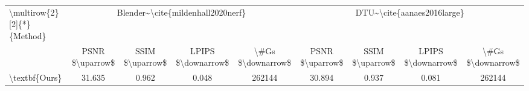 \begin{tabular}{lcccccccc}
\toprule
\textbackslash multirow\{2\}[2]\{*\}\{Method\} & \multicolumn{4}{c}{Blender\textasciitilde \textbackslash cite\{mildenhall2020nerf\}} & \multicolumn{4}{c}{DTU\textasciitilde \textbackslash cite\{aanaes2016large\}} \\
\cmidrule(lr){2-5}\cmidrule(lr){6-9}
                           &                   PSNR \$\textbackslash uparrow\$ & SSIM \$\textbackslash uparrow\$ & LPIPS \$\textbackslash downarrow\$ & \textbackslash \#Gs \$\textbackslash downarrow\$ &            PSNR \$\textbackslash uparrow\$ & SSIM \$\textbackslash uparrow\$ & LPIPS \$\textbackslash downarrow\$ & \textbackslash \#Gs \$\textbackslash downarrow\$ \\
\midrule
\midrule
             \textbackslash textbf\{Ours\} &                            31.635 &           0.962 &              0.048 &            262144 &                     30.894 &           0.937 &              0.081 &            262144 \\
\bottomrule
\end{tabular}
